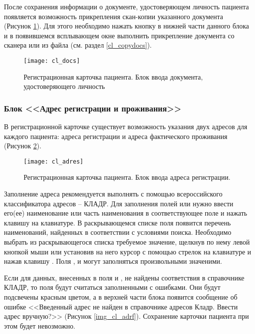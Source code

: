 {После сохранения информации о документе, удостоверяющем личность пациента появляется возможность прикрепления скан-копии указанного документа (Рисунок \ref{img_cl_docs}). Для этого необходимо нажать кнопку  в нижней части данного блока и в появившемся всплывающем окне выполнить прикрепление документа со сканера или из файла (см. раздел \ref{cl_copydocs}).  

\begin{figure}[ht]\centering
 \texttt{[image: cl\_docs]}
 \caption{Регистрационная карточка пациента. Блок ввода документа, удостоверяющего личность}
 \label{img_cl_docs}
\end{figure} 

\subsubsection{Блок <<Адрес регистрации и проживания>>}

В регистрационной карточке существует возможность указания двух адресов для каждого пациента: адреса регистрации и адреса фактического проживания (Рисунок \ref{img_cl_adres}). 

\begin{figure}[ht]\centering
 \texttt{[image: cl\_adres]}
 \caption{Регистрационная карточка пациента. Блок ввода адреса регистрации.}
 \label{img_cl_adres}
\end{figure} 

Заполнение адреса рекомендуется выполнять с помощью всероссийского классификатора адресов -- КЛАДР. Для заполнения полей  или  нужно ввести его(ее) наименование или часть наименования в соответствующее поле и нажать клавишу  на клавиатуре. В раскрывающемся списке поля появится перечень наименований, найденных в соответствии с условиями поиска. Необходимо выбрать из раскрывающегося списка требуемое значение, щелкнув по нему левой кнопкой мыши или установив на него курсор с помощью стрелок на клавиатуре и нажав клавишу . Поля ,  и  могут заполняться произвольными значеними.

Если для данных, внесенных в поля  и , не найдены соответствия в справочнике КЛАДР, то поля будут считаться заполненными с ошибками. Они будут подсвечены красным цветом, а в верхней части блока появится сообщение об ошибке <<Введенный адрес не найден в справочнике адресов Кладр. Ввести адрес вручную?>> (Рисунок \ref{img_cl_adrf}). Сохранение карточки пациента при этом будет невозможно. 

}
